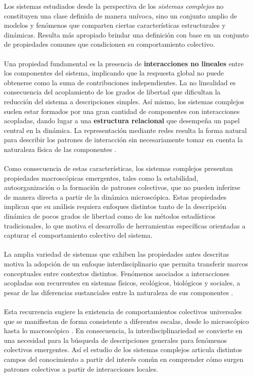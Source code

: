 Los sistemas estudiados desde la perspectiva de los \textit{sistemas complejos} no constituyen una clase definida de manera unívoca, sino un conjunto amplio de modelos y fenómenos que comparten ciertas características estructurales y dinámicas. Resulta más apropiado brindar una definición con base en un conjunto de propiedades comunes que condicionen su comportamiento colectivo.\\
\\
Una propiedad fundamental es la presencia de \textbf{interacciones no lineales} entre los componentes del sistema, implicando que la respuesta global no puede obtenerse como la suma de contribuciones independientes. La no linealidad es consecuencia del acoplamiento de los grados de libertad que dificultan la reducción del sistema a descripciones simples. Así mismo, los sistemas complejos suelen estar formados por una gran cantidad de componentes con interacciones acopladas, dando lugar a una \textbf{estructura relacional} que desempeña un papel central en la dinámica. La representación mediante redes resulta la forma natural para describir los patrones de interacción sin necesariamente tomar en cuenta la naturaleza física de las componentes \cite{posfai2016network,newman2018networks}.\\
\\
Como consecuencia de estas características, los sistemas complejos presentan propiedades macroscópicas emergentes, tales como la estabilidad, autoorganización o la formación de patrones colectivos, que no pueden inferirse de manera directa a partir de la dinámica microscópica. Estas propiedades implican que su análisis requiera enfoques distintos tanto de la descripción dinámica de pocos grados de libertad como de los métodos estadísticos tradicionales, lo que motiva el desarrollo de herramientas específicas orientadas a capturar el comportamiento colectivo del sistema.
\\
\\
La amplia variedad de sistemas que exhiben las propiedades antes descritas motiva la adopción de un enfoque interdisciplinario que permita transferir marcos conceptuales entre contextos distintos. Fenómenos asociados a interacciones acopladas son recurrentes en sistemas físicos, ecológicos, biológicos y sociales, a pesar de las diferencias sustanciales entre la naturaleza de sus componentes \cite{Koppen2005Interdisciplina}. \\
\\
Esta recurrencia sugiere la existencia de comportamientos colectivos universales que se manifiestan de forma consistente a diferentes escalas, desde lo microscópico hasta lo macroscópico \cite[p. 97--103]{ramirez1999perspectivas}. En consecuencia, la interdisciplinariedad se convierte en una necesidad para la búsqueda de descripciones generales para fenómenos colectivos emergentes. Así el estudio de los sistemas complejos articula distintos campos del conocimiento a partir del interés común en comprender cómo surgen patrones colectivos a partir de interacciones locales.
